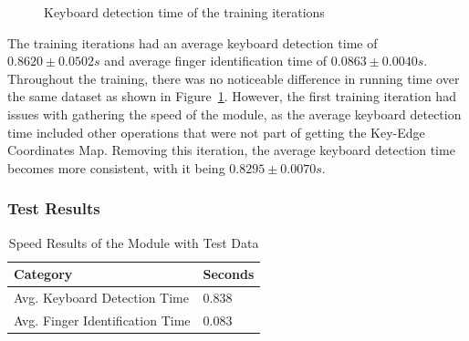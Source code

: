 \documentclass{report}
\begin{document}
\begin{figure}[H]
	\centering
	\caption{Keyboard detection time of the training iterations}
	\label{fig:rd-training-keyboard-detection-time}
\end{figure}

The training iterations had an average keyboard detection time of
$0.8620\pm0.0502s$ and average finger identification time of $0.0863\pm0.0040s$.
Throughout the training, there was no noticeable difference in running time over
the same dataset as shown in
Figure~\ref{fig:rd-training-keyboard-detection-time}. However, the first
training iteration had issues with gathering the speed of the module, as the
average keyboard detection time included other operations that were not part of
getting the Key-Edge Coordinates Map. Removing this iteration, the average
keyboard detection time becomes more consistent, with it being
$0.8295\pm0.0070s$.

\subsubsection{Test Results}

\begin{table}[H]
	\small
	\centering
	\caption{\label{tab:rd-speed}Speed Results of the Module with Test Data}
	\begin{tabular}{ p{} R{0.2\textwidth} }
		\toprule
		Category                        & Seconds \\
		\midrule
		Avg. Keyboard Detection Time    & 0.838   \\
		Avg. Finger Identification Time & 0.083   \\
		\bottomrule
	\end{tabular}
\end{table}
\end{document}
